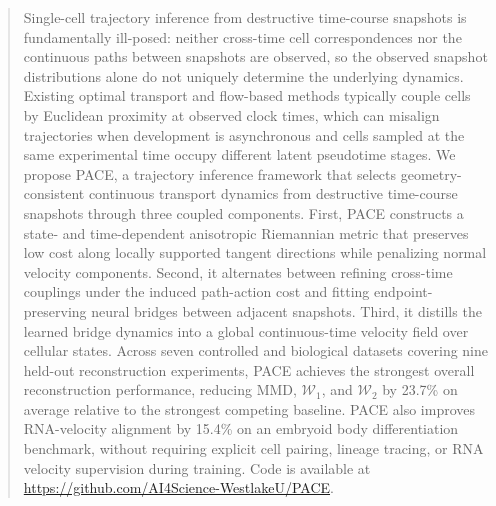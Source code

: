 \begin{abstract}
Single-cell trajectory inference from destructive time-course snapshots is fundamentally ill-posed: neither cross-time cell correspondences nor the continuous paths between snapshots are observed, so the observed snapshot distributions alone do not uniquely determine the underlying dynamics. 
Existing optimal transport and flow-based methods typically couple cells by Euclidean proximity at observed clock times, which can misalign trajectories when development is asynchronous and cells sampled at the same experimental time occupy different latent pseudotime stages. 
We propose PACE, a trajectory inference framework that selects geometry-consistent continuous transport dynamics from destructive time-course snapshots through three coupled components.
First, PACE constructs a state- and time-dependent anisotropic Riemannian metric that preserves low cost along locally supported tangent directions while penalizing normal velocity components.
Second, it alternates between refining cross-time couplings under the induced path-action cost and fitting endpoint-preserving neural bridges between adjacent snapshots.
Third, it distills the learned bridge dynamics into a global continuous-time velocity field over cellular states.
Across seven controlled and biological datasets covering nine held-out reconstruction experiments, PACE achieves the strongest overall reconstruction performance, reducing MMD, $\mathcal{W}_1$, and $\mathcal{W}_2$ by 23.7\% on average relative to the strongest competing baseline.
PACE also improves RNA-velocity alignment by 15.4\% on an embryoid body differentiation benchmark, without requiring explicit cell pairing, lineage tracing, or RNA velocity supervision during training.
Code is available at \url{https://github.com/AI4Science-WestlakeU/PACE}.
\end{abstract}
